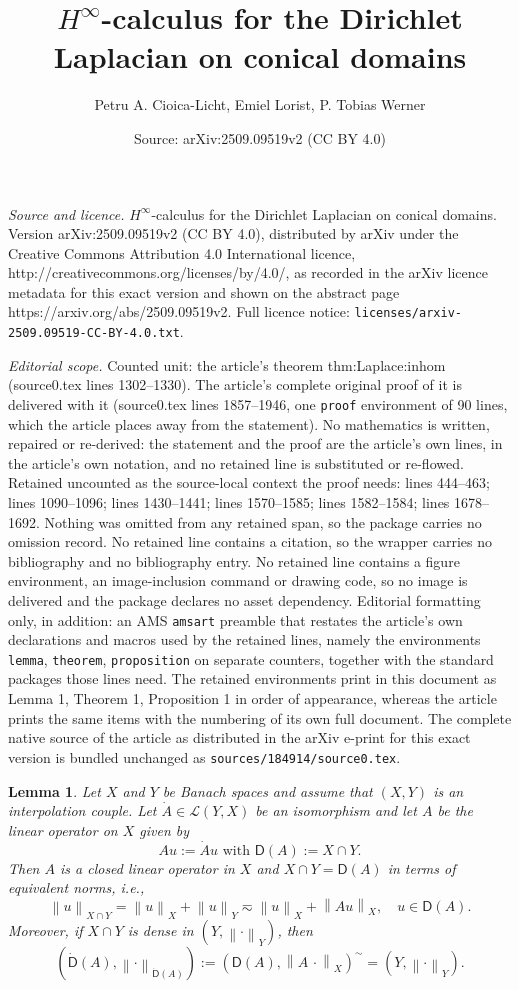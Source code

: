 \documentclass[10pt,a4paper]{amsart}
\title{$H^\infty$-calculus for the Dirichlet Laplacian on conical domains}
\author{Petru A. Cioica-Licht, Emiel Lorist, P. Tobias Werner}
\date{Source: arXiv:2509.09519v2 (CC BY 4.0)}
\newtheorem{lemma}{Lemma}
\newcommand{\nrm}[1]{\left\lVert #1 \right\rVert}
\newcommand{\scrL}{\ensuremath{\mathscr{L}}}
\newcommand{\sfD}{\ensuremath{\mathsf{D}}}
\begin{document}
\maketitle

\noindent\emph{Source and licence.} $H^\infty$-calculus for the Dirichlet Laplacian on conical domains. Version arXiv:2509.09519v2 (CC BY 4.0), distributed by arXiv under the Creative Commons Attribution 4.0 International licence, http://creativecommons.org/licenses/by/4.0/, as recorded in the arXiv licence metadata for this exact version and shown on the abstract page https://arxiv.org/abs/2509.09519v2. Full licence notice: \texttt{licenses/arxiv-2509.09519-CC-BY-4.0.txt}.\par\smallskip

\noindent\textit{Editorial scope.} Counted unit: the article's theorem thm:Laplace:inhom (source0.tex lines 1302--1330). The article's complete original proof of it is delivered with it (source0.tex lines 1857--1946, one \texttt{proof} environment of 90 lines, which the article places away from the statement). No mathematics is written, repaired or re-derived: the statement and the proof are the article's own lines, in the article's own notation, and no retained line is substituted or re-flowed.  Retained uncounted as the source-local context the proof needs: lines 444--463; lines 1090--1096; lines 1430--1441; lines 1570--1585; lines 1582--1584; lines 1678--1692.  Nothing was omitted from any retained span, so the package carries no omission record.  No retained line contains a citation, so the wrapper carries no bibliography and no bibliography entry.  No retained line contains a figure environment, an image-inclusion command or drawing code, so no image is delivered and the package declares no asset dependency.  Editorial formatting only, in addition: an AMS \texttt{amsart} preamble that restates the article's own declarations and macros used by the retained lines, namely the environments \texttt{lemma}, \texttt{theorem}, \texttt{proposition} on separate counters, together with the standard packages those lines need.  The retained environments print in this document as Lemma 1, Theorem 1, Proposition 1 in order of appearance, whereas the article prints the same items with the numbering of its own full document.  The complete native source of the article as distributed in the arXiv e-print for this exact version is bundled unchanged as \texttt{sources/184914/source0.tex}.
\begin{lemma}\label{lem:isom:unbdd}
Let $X$ and $Y$ be Banach spaces and assume that $(X,Y)$ is an interpolation couple. 
Let $\Dot{A}\in\scrL(Y,X)$ be an isomorphism and let $A$ be the linear operator on $X$ given by
\[
Au:= \Dot A u \text{ with } \sfD(A):= X\cap Y.
\]
Then $A$ is a closed linear operator in $X$ and $X\cap Y=\sfD(A)$ in terms of equivalent norms, i.e., 
\[
\nrm{u}_{X\cap Y} = \nrm{u}_X + \nrm{u}_Y \eqsim \nrm{u}_X + \nrm{Au}_X,\quad u\in \sfD(A).
\]
Moreover, if $X\cap Y$ is dense in $(Y,\nrm{\cdot}_Y)$, then
\[
(\Dot{\sfD}(A),\nrm{\cdot}_{\Dot{\sfD}(A)})
:=
(\sfD(A),\nrm{A\,\cdot}_X)^\sim
=
(Y,\nrm{\cdot}_Y).
\]

\end{lemma}
\end{document}
